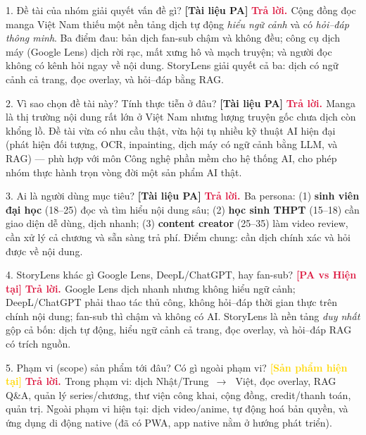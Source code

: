 \documentclass[11pt]{article}
\newcommand{\arr}{\,\ensuremath{\rightarrow}\,}
\newcommand{\tagPA}{\textcolor{steel}{\footnotesize\textbf{[Tài liệu PA]}}}
\newcommand{\tagSP}{\textcolor{gold}{\footnotesize\textbf{[Sản phẩm hiện tại]}}}
\newcommand{\tagBoth}{\textcolor{crimson}{\footnotesize\textbf{[PA vs Hiện tại]}}}
\newcommand{\A}{\textbf{\textcolor{crimson}{Trả lời. }}}
\begin{document}
\begin{qa}{1. Đề tài của nhóm giải quyết vấn đề gì? \tagPA}
\A Cộng đồng đọc manga Việt Nam thiếu một nền tảng dịch tự động \textit{hiểu ngữ cảnh} và có \textit{hỏi--đáp thông minh}. Ba điểm đau: bản dịch fan-sub chậm và không đều; công cụ dịch máy (Google Lens) dịch rời rạc, mất xưng hô và mạch truyện; và người đọc không có kênh hỏi ngay về nội dung. StoryLens giải quyết cả ba: dịch có ngữ cảnh cả trang, đọc overlay, và hỏi--đáp bằng RAG.
\end{qa}

\begin{qa}{2. Vì sao chọn đề tài này? Tính thực tiễn ở đâu? \tagPA}
\A Manga là thị trường nội dung rất lớn ở Việt Nam nhưng lượng truyện gốc chưa dịch còn khổng lồ. Đề tài vừa có nhu cầu thật, vừa hội tụ nhiều kỹ thuật AI hiện đại (phát hiện đối tượng, OCR, inpainting, dịch máy có ngữ cảnh bằng LLM, và RAG) --- phù hợp với môn Công nghệ phần mềm cho hệ thống AI, cho phép nhóm thực hành trọn vòng đời một sản phẩm AI thật.
\end{qa}

\begin{qa}{3. Ai là người dùng mục tiêu? \tagPA}
\A Ba persona: (1) \textbf{sinh viên đại học} (18--25) đọc và tìm hiểu nội dung sâu; (2) \textbf{học sinh THPT} (15--18) cần giao diện dễ dùng, dịch nhanh; (3) \textbf{content creator} (25--35) làm video review, cần xử lý cả chương và sẵn sàng trả phí. Điểm chung: cần dịch chính xác và hỏi được về nội dung.
\end{qa}

\begin{qa}{4. StoryLens khác gì Google Lens, DeepL/ChatGPT, hay fan-sub? \tagBoth}
\A Google Lens dịch nhanh nhưng không hiểu ngữ cảnh; DeepL/ChatGPT phải thao tác thủ công, không hỏi--đáp thời gian thực trên chính nội dung; fan-sub thì chậm và không có AI. StoryLens là nền tảng \textit{duy nhất} gộp cả bốn: dịch tự động, hiểu ngữ cảnh cả trang, đọc overlay, và hỏi--đáp RAG có trích nguồn.
\end{qa}

\begin{qa}{5. Phạm vi (scope) sản phẩm tới đâu? Có gì ngoài phạm vi? \tagSP}
\A Trong phạm vi: dịch Nhật/Trung \arr\ Việt, đọc overlay, RAG Q\&A, quản lý series/chương, thư viện công khai, cộng đồng, credit/thanh toán, quản trị. Ngoài phạm vi hiện tại: dịch video/anime, tự động hoá bản quyền, và ứng dụng di động native (đã có PWA, app native nằm ở hướng phát triển).
\end{qa}
\end{document}

